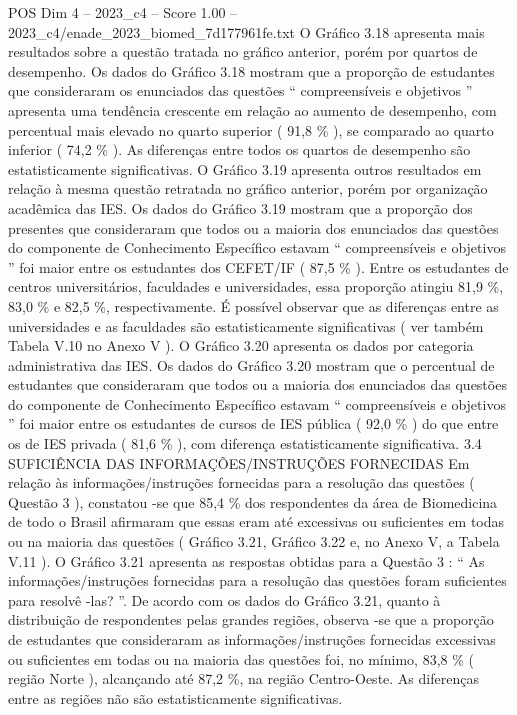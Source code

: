\begin{textsample}{POS Dim 4 – 2023\_c4 – Score 1.00 – 2023\_c4/enade\_2023\_biomed\_7d177961fe.txt}
O Gráfico 3.18 apresenta mais resultados sobre a questão tratada no gráfico anterior, porém por quartos de desempenho.
Os dados do Gráfico 3.18 mostram que a proporção de estudantes que consideraram os enunciados das questões “ compreensíveis e objetivos ” apresenta uma tendência crescente em relação ao aumento de desempenho, com percentual mais elevado no quarto superior ( 91,8 \% ), se comparado ao quarto inferior ( 74,2 \% ).
As diferenças entre todos os quartos de desempenho são estatisticamente significativas.
O Gráfico 3.19 apresenta outros resultados em relação à mesma questão retratada no gráfico anterior, porém por organização acadêmica das IES.
Os dados do Gráfico 3.19 mostram que a proporção dos presentes que consideraram que todos ou a maioria dos enunciados das questões do componente de Conhecimento Específico estavam “ compreensíveis e objetivos ” foi maior entre os estudantes dos CEFET/IF ( 87,5 \% ).
Entre os estudantes de centros universitários, faculdades e universidades, essa proporção atingiu 81,9 \%, 83,0 \% e 82,5 \%, respectivamente.
É possível observar que as diferenças entre as universidades e as faculdades são estatisticamente significativas ( ver também Tabela V.10 no Anexo V ).
O Gráfico 3.20 apresenta os dados por categoria administrativa das IES.
Os dados do Gráfico 3.20 mostram que o percentual de estudantes que consideraram que todos ou a maioria dos enunciados das questões do componente de Conhecimento Específico estavam “ compreensíveis e objetivos ” foi maior entre os estudantes de cursos de IES pública ( 92,0 \% ) do que entre os de IES privada ( 81,6 \% ), com diferença estatisticamente significativa. 3.4 SUFICIÊNCIA DAS INFORMAÇÕES/INSTRUÇÕES FORNECIDAS Em relação às informações/instruções fornecidas para a resolução das questões ( Questão 3 ), constatou -se que 85,4 \% dos respondentes da área de Biomedicina de todo o Brasil afirmaram que essas eram até excessivas ou suficientes em todas ou na maioria das questões ( Gráfico 3.21, Gráfico 3.22 e, no Anexo V, a Tabela V.11 ).
O Gráfico 3.21 apresenta as respostas obtidas para a Questão 3 : “ As informações/instruções fornecidas para a resolução das questões foram suficientes para resolvê -las? ”.
De acordo com os dados do Gráfico 3.21, quanto à distribuição de respondentes pelas grandes regiões, observa -se que a proporção de estudantes que consideraram as informações/instruções fornecidas excessivas ou suficientes em todas ou na maioria das questões foi, no mínimo, 83,8 \% ( região Norte ), alcançando até 87,2 \%, na região Centro-Oeste.
As diferenças entre as regiões não são estatisticamente significativas.

\end{textsample}
